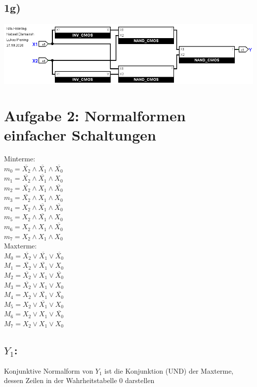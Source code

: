 \documentclass[]{article}
\newcommand{\V}{\lor}
\newcommand{\A}{\land}
\newcommand{\T}[1]{\overline{#1}}
\begin{document}
\subsection*{1g)}
	\begin{center}\includegraphics[scale=0.45]{Bilder/1_g.png}\end{center}


\section*{Aufgabe 2: Normalformen einfacher Schaltungen}
	\begin{multicols}{2}
		Minterme:\\
		$m_0 = \T{X_2} \A \T{X_1} \A \T{X_0}$\\
		$m_1 = \T{X_2} \A \T{X_1} \A 	X_0$\\
		$m_2 = \T{X_2} \A     X_1 \A \T{X_0}$\\
		$m_3 = \T{X_2} \A     X_1 \A    X_0$\\
		$m_4 =     X_2 \A \T{X_1} \A \T{X_0}$\\
		$m_5 =     X_2 \A \T{X_1} \A    X_0$\\
		$m_6 =     X_2 \A     X_1 \A \T{X_0}$\\
		$m_7 =     X_2 \A     X_1 \A    X_0$\\


		Maxterme:\\
		$M_0 = \T{X_2} \V \T{X_1} \V \T{X_0}$\\
		$M_1 = \T{X_2} \V \T{X_1} \V 	X_0$\\
		$M_2 = \T{X_2} \V 	  X_1 \V \T{X_0}$\\
		$M_3 = \T{X_2} \V     X_1 \V    X_0$\\
		$M_4 =     X_2 \V \T{X_1} \V \T{X_0}$\\
		$M_5 =     X_2 \V \T{X_1} \V    X_0$\\
		$M_6 =     X_2 \V     X_1 \V \T{X_0}$\\
		$M_7 =     X_2 \V     X_1 \V    X_0$\\
	\end{multicols}
\subsection*{$Y_1$:}
	Konjunktive Normalform von $Y_1$ ist die Konjunktion (UND) der Maxterme, dessen Zeilen in der Wahrheitstabelle $0$ darstellen\\
\end{document}
